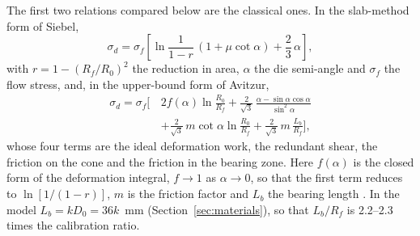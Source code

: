 The first two relations compared below are the classical ones. In the slab-method form of Siebel,
\begin{equation}
\sigma_d = \sigma_f\left[\ln\frac{1}{1-r}\,(1+\mu\cot\alpha) + \frac{2}{3}\,\alpha\right],
\label{eq:siebel}
\end{equation}
with $r = 1-(R_f/R_0)^2$ the reduction in area, $\alpha$ the die semi-angle and $\sigma_f$ the flow
stress, and, in the upper-bound form of Avitzur,
\begin{equation}
\begin{split}
\sigma_d = \sigma_f\biggl[\,&2f(\alpha)\ln\frac{R_0}{R_f}
  + \frac{2}{\sqrt3}\,\frac{\alpha-\sin\alpha\cos\alpha}{\sin^2\alpha}\\
  &+ \frac{2}{\sqrt3}\,m\cot\alpha\ln\frac{R_0}{R_f}
  + \frac{2}{\sqrt3}\,m\,\frac{L_b}{R_f}\biggr],
\end{split}
\label{eq:avitzur}
\end{equation}
whose four terms are the ideal deformation work, the redundant shear, the friction on the cone and
the friction in the bearing zone. Here $f(\alpha)$ is the closed form of the deformation integral,
$f\to1$ as $\alpha\to0$, so that the first
term reduces to $\ln[1/(1-r)]$, $m$ is the friction factor and $L_b$ the bearing length
\citep{siebel1947drahtziehen,avitzur1968metal,avitzur1971study}. In the model
$L_b = kD_0 = 36k$~mm (Section~\ref{sec:materials}), so that $L_b/R_f$ is 2.2--2.3 times the
calibration ratio.

